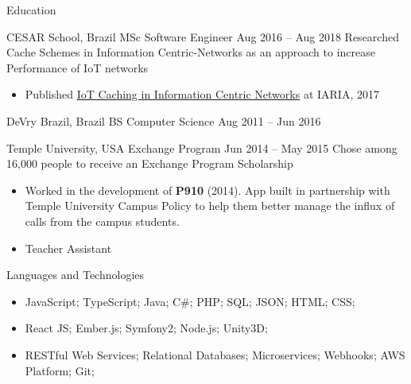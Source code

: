 \documentclass[]{mcdowellcv}
\begin{document}
	\begin{cvsection}{Education}
		\begin{cvsubsection}{CESAR School, Brazil} {MSc Software Engineer} {Aug 2016 -- Aug 2018}
            Researched Cache Schemes in Information Centric-Networks as an approach to increase Performance of IoT networks
			\begin{itemize}
                \item Published \href{https://www.thinkmind.org/index.php?view=article&articleid=icsea_2017_9_10_10019}{IoT Caching in Information Centric Networks} at IARIA, 2017
			\end{itemize}
		\end{cvsubsection}

        \begin{cvsubsection}{DeVry Brazil, Brazil} {BS Computer Science} {Aug 2011 -- Jun 2016}
        \end{cvsubsection}

        \begin{cvsubsection}{Temple University, USA} {Exchange Program} {Jun 2014 -- May 2015}
            Chose among 16,000 people to receive an Exchange Program Scholarship
            \begin{itemize}
                \item Worked in the development of \textbf{P910} (2014). App built in partnership with Temple University Campus Policy to help them better manage the influx of calls from the campus students.
                \item Teacher Assistant
            \end{itemize}
        \end{cvsubsection}
	\end{cvsection}

	\begin{cvsection}{Languages and Technologies}
		\begin{cvsubsection}{}{}{}
			\begin{itemize}
                \item JavaScript; TypeScript; Java; C\#; PHP; SQL; JSON; HTML; CSS;
                \item React JS; Ember.js; Symfony2; Node.js; Unity3D;
                \item RESTful Web Services; Relational Databases; Microservices; Webhooks; AWS Platform; Git;
			\end{itemize}
		\end{cvsubsection}
	\end{cvsection}
\end{document}
